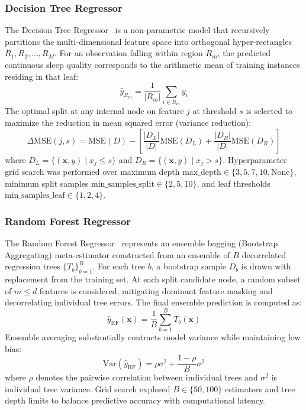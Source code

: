 \documentclass[12pt,a4paper]{article}
\begin{document}
\subsubsection{Decision Tree Regressor}
The Decision Tree Regressor~\cite{decision_trees} is a non-parametric model that recursively partitions the multi-dimensional feature space into orthogonal hyper-rectangles $R_1, R_2, \dots, R_M$. For an observation falling within region $R_m$, the predicted continuous sleep quality corresponds to the arithmetic mean of training instances residing in that leaf:
\begin{equation}
    \hat{y}_{R_m} = \frac{1}{|R_m|} \sum_{i \in R_m} y_i
\end{equation}
The optimal split at any internal node on feature $j$ at threshold $s$ is selected to maximize the reduction in mean squared error (variance reduction):
\begin{equation}
    \Delta \text{MSE}(j, s) = \text{MSE}(D) - \left[ \frac{|D_L|}{|D|} \text{MSE}(D_L) + \frac{|D_R|}{|D|} \text{MSE}(D_R) \right]
\end{equation}
where $D_L = \{(\mathbf{x}, y) \mid x_j \le s\}$ and $D_R = \{(\mathbf{x}, y) \mid x_j > s\}$. Hyperparameter grid search was performed over maximum depth $\text{max\_depth} \in \{3, 5, 7, 10, \text{None}\}$, minimum split samples $\text{min\_samples\_split} \in \{2, 5, 10\}$, and leaf thresholds $\text{min\_samples\_leaf} \in \{1, 2, 4\}$.

\subsubsection{Random Forest Regressor}
The Random Forest Regressor~\cite{random_forests} represents an ensemble bagging (Bootstrap Aggregating) meta-estimator constructed from an ensemble of $B$ decorrelated regression trees $\{T_b\}_{b=1}^B$. For each tree $b$, a bootstrap sample $D_b$ is drawn with replacement from the training set. At each split candidate node, a random subset of $m \le d$ features is considered, mitigating dominant feature masking and decorrelating individual tree errors. The final ensemble prediction is computed as:
\begin{equation}
    \hat{y}_{\text{RF}}(\mathbf{x}) = \frac{1}{B} \sum_{b=1}^B T_b(\mathbf{x})
\end{equation}
Ensemble averaging substantially contracts model variance while maintaining low bias:
\begin{equation}
    \text{Var}\left( \hat{y}_{\text{RF}} \right) = \rho \sigma^2 + \frac{1 - \rho}{B} \sigma^2
\end{equation}
where $\rho$ denotes the pairwise correlation between individual trees and $\sigma^2$ is individual tree variance. Grid search explored $B \in \{50, 100\}$ estimators and tree depth limits to balance predictive accuracy with computational latency.
\end{document}
